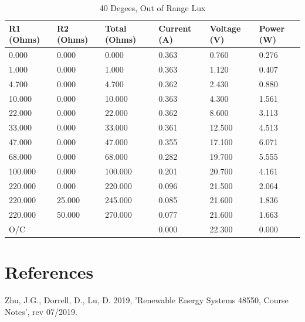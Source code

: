 \documentclass{article}
\begin{document}
		\begin{table}[H]
			\centering
			\caption{40 Degees, Out of Range Lux}
			\begin{tabular}{|l|l|l|l|l|l|}
				\hline
				
				\textbf{R1 (Ohms)} & \textbf{R2 (Ohms)} & \textbf{Total (Ohms)} & \textbf{Current (A)} & \textbf{Voltage (V)} & \textbf{Power (W)} \\ \hline
				0.000 & 0.000 & 0.000 & 0.363 & 0.760 & 0.276 \\ \hline
				1.000 & 0.000 & 1.000 & 0.363 & 1.120 & 0.407 \\ \hline
				4.700 & 0.000 & 4.700 & 0.362 & 2.430 & 0.880 \\ \hline
				10.000 & 0.000 & 10.000 & 0.363 & 4.300 & 1.561 \\ \hline
				22.000 & 0.000 & 22.000 & 0.362 & 8.600 & 3.113 \\ \hline
				33.000 & 0.000 & 33.000 & 0.361 & 12.500 & 4.513 \\ \hline
				47.000 & 0.000 & 47.000 & 0.355 & 17.100 & 6.071 \\ \hline
				68.000 & 0.000 & 68.000 & 0.282 & 19.700 & 5.555 \\ \hline
				100.000 & 0.000 & 100.000 & 0.201 & 20.700 & 4.161 \\ \hline
				220.000 & 0.000 & 220.000 & 0.096 & 21.500 & 2.064 \\ \hline
				220.000 & 25.000 & 245.000 & 0.085 & 21.600 & 1.836 \\ \hline
				220.000 & 50.000 & 270.000 & 0.077 & 21.600 & 1.663 \\ \hline
				O/C & & & 0.000 & 22.300 & 0.000 \\ \hline
				
			\end{tabular}
		\end{table}
	
	\section{References}
		Zhu, J.G., Dorrell, D., Lu, D. 2019, 'Renewable Energy Systems 48550, Course Notes', rev 07/2019.
		
\end{document}
